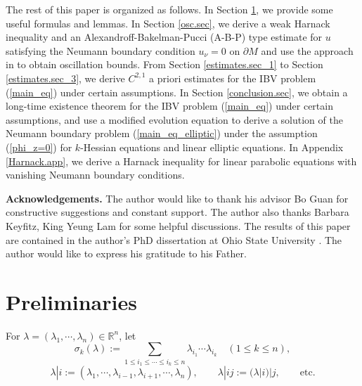 \documentclass[12pt]{amsart}
\theoremstyle{definition}
\theoremstyle{remark}
\numberwithin{equation}{section}
\begin{document}
The rest of this paper is organized as follows. 
In Section \ref{pre.sec}, we provide some useful formulas and lemmas.
In Section \ref{osc.sec}, we derive a weak Harnack inequality and an Alexandroff-Bakelman-Pucci (A-B-P) type estimate for $u$ satisfying the Neumann boundary condition $u_\nu = 0$ on $\partial M$ and use the approach in \cite{Sze15} to obtain oscillation bounds.
From Section \ref{estimates.sec_1} to Section \ref{estimates.sec_3}, we derive $C^{2, 1}$ a priori estimates for the IBV problem (\ref{main_eq}) under certain assumptions. 
In Section \ref{conclusion.sec}, we obtain a long-time existence theorem for the IBV problem (\ref{main_eq}) under certain assumptions, and use a modified evolution equation to derive a solution of the Neumann boundary problem (\ref{main_eq_elliptic}) under the assumption (\ref{phi_z=0}) for $k$-Hessian equations and linear elliptic equations. 
In Appendix \ref{Harnack.app}, we derive a Harnack inequality for linear parabolic equations with vanishing Neumann boundary conditions.

\vspace{1em}
\noindent
{\bf Acknowledgements.} The author would like to thank his advisor Bo Guan for constructive suggestions and constant support. The author also thanks Barbara Keyfitz, King Yeung Lam for some helpful discussions. The results of this paper are contained in the author’s PhD dissertation at Ohio State University \cite{GuoThesis19}. The author would like to express his gratitude to his Father.




\section{Preliminaries}\label{pre.sec}
For $\lambda  = (\lambda_1, \cdots, \lambda_n) \in \mathbb{R}^n$, 
let 
$$\sigma_k (\lambda) := \sum_{1 \leq i_1 \leq \cdots \leq i_k \leq n} \lambda_{i_1} \cdots \lambda_{i_k} \quad (1 \leq k \leq n),$$
$$\lambda|i := (\lambda_1, \cdots, \lambda_{i-1}, \lambda_{i+1}, \cdots, \lambda_n), \qquad \lambda|ij := (\lambda|i)|j, \qquad \text{etc}.$$
\end{document}
